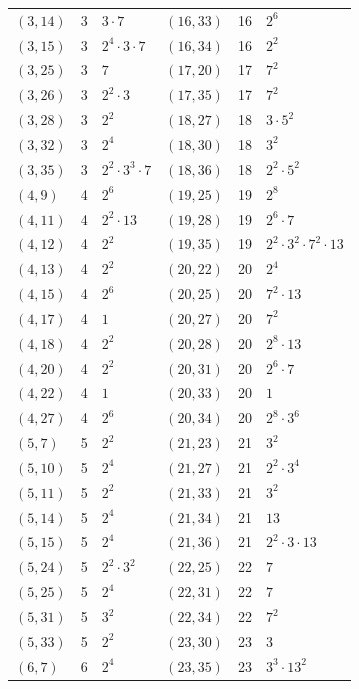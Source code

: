 \documentclass[11pt]{article}
\begin{document}
\begin{longtable}{@{}lrl@{\qquad}lrl@{}}
$(3,14)$ & 3 & $3\cdot 7$ & $(16,33)$ & 16 & $2^{6}$\\
$(3,15)$ & 3 & $2^{4}\cdot 3\cdot 7$ & $(16,34)$ & 16 & $2^{2}$\\
$(3,25)$ & 3 & $7$ & $(17,20)$ & 17 & $7^{2}$\\
$(3,26)$ & 3 & $2^{2}\cdot 3$ & $(17,35)$ & 17 & $7^{2}$\\
$(3,28)$ & 3 & $2^{2}$ & $(18,27)$ & 18 & $3\cdot 5^{2}$\\
$(3,32)$ & 3 & $2^{4}$ & $(18,30)$ & 18 & $3^{2}$\\
$(3,35)$ & 3 & $2^{2}\cdot 3^{3}\cdot 7$ & $(18,36)$ & 18 & $2^{2}\cdot 5^{2}$\\
$(4,9)$ & 4 & $2^{6}$ & $(19,25)$ & 19 & $2^{8}$\\
$(4,11)$ & 4 & $2^{2}\cdot 13$ & $(19,28)$ & 19 & $2^{6}\cdot 7$\\
$(4,12)$ & 4 & $2^{2}$ & $(19,35)$ & 19 & $2^{2}\cdot 3^{2}\cdot 7^{2}\cdot 13$\\
$(4,13)$ & 4 & $2^{2}$ & $(20,22)$ & 20 & $2^{4}$\\
$(4,15)$ & 4 & $2^{6}$ & $(20,25)$ & 20 & $7^{2}\cdot 13$\\
$(4,17)$ & 4 & $1$ & $(20,27)$ & 20 & $7^{2}$\\
$(4,18)$ & 4 & $2^{2}$ & $(20,28)$ & 20 & $2^{8}\cdot 13$\\
$(4,20)$ & 4 & $2^{2}$ & $(20,31)$ & 20 & $2^{6}\cdot 7$\\
$(4,22)$ & 4 & $1$ & $(20,33)$ & 20 & $1$\\
$(4,27)$ & 4 & $2^{6}$ & $(20,34)$ & 20 & $2^{8}\cdot 3^{6}$\\
$(5,7)$ & 5 & $2^{2}$ & $(21,23)$ & 21 & $3^{2}$\\
$(5,10)$ & 5 & $2^{4}$ & $(21,27)$ & 21 & $2^{2}\cdot 3^{4}$\\
$(5,11)$ & 5 & $2^{2}$ & $(21,33)$ & 21 & $3^{2}$\\
$(5,14)$ & 5 & $2^{4}$ & $(21,34)$ & 21 & $13$\\
$(5,15)$ & 5 & $2^{4}$ & $(21,36)$ & 21 & $2^{2}\cdot 3\cdot 13$\\
$(5,24)$ & 5 & $2^{2}\cdot 3^{2}$ & $(22,25)$ & 22 & $7$\\
$(5,25)$ & 5 & $2^{4}$ & $(22,31)$ & 22 & $7$\\
$(5,31)$ & 5 & $3^{2}$ & $(22,34)$ & 22 & $7^{2}$\\
$(5,33)$ & 5 & $2^{2}$ & $(23,30)$ & 23 & $3$\\
$(6,7)$ & 6 & $2^{4}$ & $(23,35)$ & 23 & $3^{3}\cdot 13^{2}$\\

\end{longtable}
\end{document}
